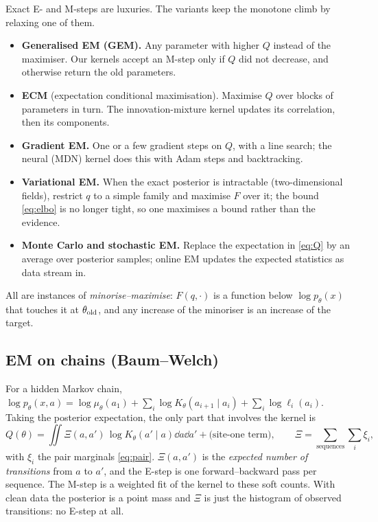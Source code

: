 Exact E- and M-steps are luxuries. The variants keep the monotone climb by relaxing one of them.
\begin{itemize}
\item \textbf{Generalised EM (GEM).} Any parameter with higher $Q$ instead of the maximiser. Our kernels accept an
  M-step only if $Q$ did not decrease, and otherwise return the old parameters.
\item \textbf{ECM} (expectation conditional maximisation). Maximise $Q$ over blocks of parameters in turn. The
  innovation-mixture kernel updates its correlation, then its components.
\item \textbf{Gradient EM.} One or a few gradient steps on $Q$, with a line search; the neural (MDN) kernel does
  this with Adam steps and backtracking.
\item \textbf{Variational EM.} When the exact posterior is intractable (two-dimensional fields), restrict $q$ to a
  simple family and maximise $F$ over it; the bound \eqref{eq:elbo} is no longer tight, so one maximises a bound
  rather than the evidence.
\item \textbf{Monte Carlo and stochastic EM.} Replace the expectation in \eqref{eq:Q} by an average over posterior
  samples; online EM updates the expected statistics as data stream in.
\end{itemize}
All are instances of \emph{minorise--maximise}: $F(q,\cdot)$ is a function below $\log p_\theta(x)$ that touches it at
$\theta_{\rm old}$, and any increase of the minoriser is an increase of the target.

\subsection{EM on chains (Baum--Welch)}\label{sec:emchain}

For a hidden Markov chain, $\log p_\theta(x,a)=\log\mu_\theta(a_1)+\sum_i\log K_\theta(a_{i+1}\mid a_i)+\sum_i\log\ell_i(a_i)$. Taking
the posterior expectation, the only part that involves the kernel is
\begin{equation}\label{eq:Qchain}
  Q(\theta)=\iint\Xi(a,a')\,\log K_\theta(a'\mid a)\dd a\dd a'+\text{(site-one term)},\qquad
  \Xi=\sum_{\text{sequences}}\sum_i\xi_i ,
\end{equation}
with $\xi_i$ the pair marginals \eqref{eq:pair}. $\Xi(a,a')$ is the \emph{expected number of transitions} from $a$ to
$a'$, and the E-step is one forward--backward pass per sequence. The M-step is a weighted fit of the kernel to
these soft counts. With clean data the posterior is a point mass and $\Xi$ is just the histogram of observed
transitions: no E-step at all.


